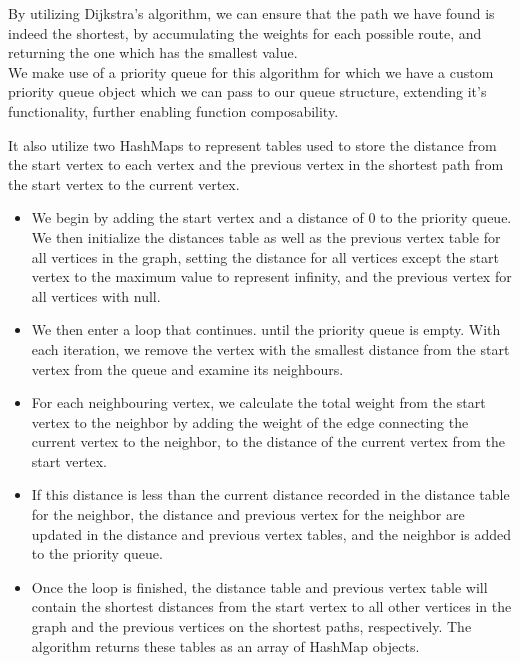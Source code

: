 \documentclass[a4paper]{article}
\begin{document}
By utilizing Dijkstra's algorithm, we can ensure that the path we have found is indeed the shortest, 
by accumulating the weights for each possible route, and returning the one which has the smallest value. \\

We make use of a priority queue for this algorithm for which we have a custom priority queue object 
which we can pass to our queue structure, extending it's functionality, further enabling function composability. \\
\newpage

It also utilize two HashMaps to represent tables used to store the distance from the start vertex 
to each vertex and the previous vertex in the shortest path from the start vertex to the current vertex. \\

\vspace{8mm}
\begin{itemize}
\item 
We begin by adding the start vertex and a distance of 0 to the priority queue.
We then initialize the distances table as well as the previous vertex table for all vertices in the graph,
setting the distance for all vertices except the start vertex to the maximum value to represent infinity,
and the previous vertex for all vertices with null. 

\item
We then enter a loop that continues.
until the priority queue is empty.
With each iteration,
we remove the vertex with the smallest distance from the start vertex from the queue
and examine its neighbours. 

\item
For each neighbouring vertex, we calculate the total weight from the start vertex to the neighbor
by adding the weight of the edge connecting the current vertex to the neighbor,
to the distance of the current vertex from the start vertex. \\

\item
If this distance is less than the current distance recorded in the distance table for the neighbor,
the distance and previous vertex for the neighbor are updated in the distance
and previous vertex tables, and the neighbor is added to the priority queue. \\

\item
Once the loop is finished, the distance table and previous vertex table
will contain the shortest distances from the start vertex to all other vertices in the graph
and the previous vertices on the shortest paths, respectively.
The algorithm returns these tables as an array of HashMap objects. \\
\end{itemize}
\vspace{20mm}
\end{document}
